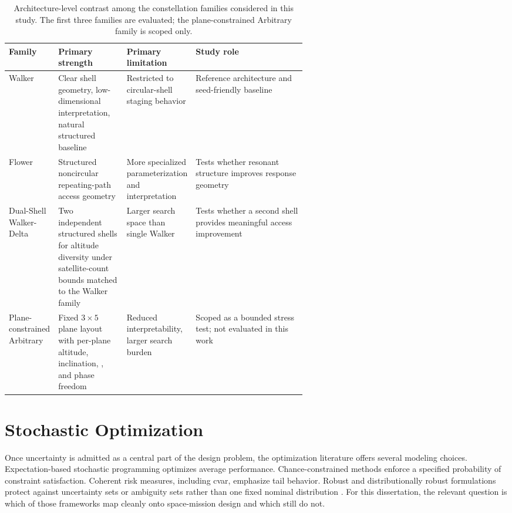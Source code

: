 \begin{table}[htb]
    \centering
    \caption[Family-level architecture contrast]{Architecture-level contrast among the constellation families considered in this study. The first three families are evaluated; the plane-constrained Arbitrary family is scoped only.}
    \label{tab:family_architecture_contrast}
    \begin{tabularx}{0.94\linewidth}{@{}L{0.14\linewidth}L{0.23\linewidth}L{0.22\linewidth}Y@{}}
        \toprule
        Family & Primary strength & Primary limitation & Study role \\
        \midrule
        Walker & Clear shell geometry, low-dimensional interpretation, natural structured baseline & Restricted to circular-shell staging behavior & Reference architecture and seed-friendly baseline \\
        Flower & Structured noncircular repeating-path access geometry & More specialized parameterization and interpretation & Tests whether resonant structure improves response geometry \\
        Dual-Shell Walker-Delta & Two independent structured shells for altitude diversity under satellite-count bounds matched to the Walker family & Larger search space than single Walker & Tests whether a second shell provides meaningful access improvement \\
        Plane-constrained Arbitrary & Fixed \(3{\times}5\) plane layout with per-plane altitude, inclination, , and phase freedom & Reduced interpretability, larger search burden & Scoped as a bounded stress test; not evaluated in this work \\
        \bottomrule
    \end{tabularx}
\end{table}

\section{Stochastic Optimization} \label{se:stochasticoptim}
Once uncertainty is admitted as a central part of the design problem, the optimization literature offers several modeling choices. Expectation-based stochastic programming optimizes average performance. Chance-constrained methods enforce a specified probability of constraint satisfaction. Coherent risk measures, including \gls{cvar}, emphasize tail behavior. Robust and distributionally robust formulations protect against uncertainty sets or ambiguity sets rather than one fixed nominal distribution \cite{birge2011stochastic,ShapiroDentchevaRuszczynski2014,charnes1959chance,rockafellar2000cvar,BertsimasSim2004,EsfahaniKuhn2018,WiesemannKuhnSim2014}. For this dissertation, the relevant question is which of those frameworks map cleanly onto space-mission design and which still do not.

